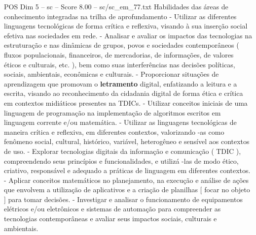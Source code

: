 \begin{textsample}{POS Dim 5 – sc – Score 8.00 – sc/sc\_em\_77.txt}
Habilidades das áreas de conhecimento integradas na trilha de aprofundamento - Utilizar as diferentes linguagens tecnológicas de forma crítica e reflexiva, visando à sua inserção social efetiva nas sociedades em rede. - Analisar e avaliar os impactos das tecnologias na estruturação e nas dinâmicas de grupos, povos e sociedades contemporâneos ( fluxos populacionais, financeiros, de mercadorias, de informações, de valores éticos e culturais, etc. ), bem como suas interferências nas decisões políticas, sociais, ambientais, econômicas e culturais. - Proporcionar situações de aprendizagem que promovam o \textbf{letramento} digital, enfatizando a leitura e a escrita, visando ao reconhecimento da cidadania digital de forma ética e crítica em contextos midiáticos presentes na TDICs. - Utilizar conceitos iniciais de uma linguagem de programação na implementação de algoritmos escritos em linguagem corrente e/ou matemática. - Utilizar as linguagens tecnológicas de maneira crítica e reflexiva, em diferentes contextos, valorizando -as como fenômeno social, cultural, histórico, variável, heterogêneo e sensível aos contextos de uso. - Explorar tecnologias digitais da informação e comunicação ( TDIC ), compreendendo seus princípios e funcionalidades, e utilizá -las de modo ético, criativo, responsável e adequado a práticas de linguagem em diferentes contextos. - Aplicar conceitos matemáticos no planejamento, na execução e análise de ações que envolvem a utilização de aplicativos e a criação de planilhas [ focar no objeto ] para tomar decisões. - Investigar e analisar o funcionamento de equipamentos elétricos e/ou eletrônicos e sistemas de automação para compreender as tecnologias contemporâneas e avaliar seus impactos sociais, culturais e ambientais.

\end{textsample}
